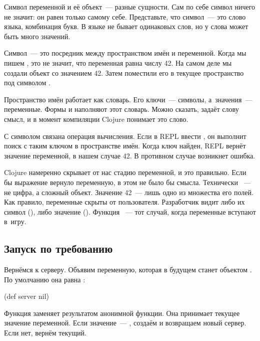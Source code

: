 

Символ переменной и её объект~--- разные сущности. Сам по себе
символ ничего не значит: он равен только самому себе. Представьте, что символ~---
это слово языка, комбинация букв. В языке не бывает одинаковых слов, но у
слова может быть много значений.


Символ~--- это посредник между пространством имён и переменной. Когда мы пишем
, это не значит, что переменная  равна числу
42. На самом деле мы создали объект  со значением 42. Затем
поместили его в текущее пространство под символом .

Пространство имён работает как словарь. Его ключи~--- символы, а~значения~---
переменные. Формы  и  наполняют этот словарь. Можно
сказать,  задаёт слову смысл, и в момент компиляции Clojure
понимает это слово.

С символом связана операция вычисления. Если в REPL ввести ,
он выполнит поиск с таким ключом в пространстве имён. Когда ключ найден, REPL
вернёт значение переменной, в нашем случае 42. В противном случае возникнет
ошибка.

Clojure намеренно скрывает от нас стадию переменной, и это правильно. Если бы
выражение  вернуло переменную, в этом не было бы смысла. Технически
~--- не цифра, а сложный объект. Значение 42~--- лишь одно из
множества его полей. Как правило, переменные скрыты от пользователя. Разработчик
видит либо их символ (), либо значение (). Функция
~--- тот случай, когда переменные вступают в~игру.

\ifafive\vspace{20mm}\fi

\subsection{Запуск по требованию}

Вернёмся к серверу. Объявим переменную, которая в будущем станет объектом
. По умолчанию она равна :

\begin{clojure}
(def server nil)
\end{clojure}

Функция  заменяет  результатом анонимной функции. Она
принимает текущее значение переменной. Если значение~--- , создаём и
возвращаем новый сервер. Если нет, вернём текущий.

